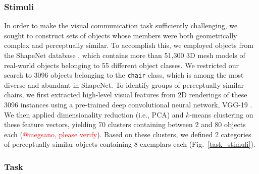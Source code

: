 \documentclass[10pt,letterpaper]{article}
\newcommand{\red}[1]{\textcolor{Red}{#1}}
\begin{document}
\subsubsection{Stimuli} 

In order to make the visual communication task sufficiently challenging, we sought to construct sets of objects whose members were both geometrically complex and perceptually similar. 
To accomplish this, we employed objects from the ShapeNet database \cite{chang2015shapenet}, which contains more than 51,300 3D mesh models of real-world objects belonging to 55 different object classes.
We restricted our search to 3096 objects belonging to the \texttt{chair} class, which is among the most diverse and abundant in ShapeNet. 
To identify groups of perceptually similar chairs, we first extracted high-level visual features from 2D renderings of these 3096 instances using a pre-trained deep convolutional neural network, VGG-19 \cite{simonyan2014very}.   
We then applied dimensionality reduction (i.e., PCA) and $k$-means clustering on these feature vectors, yielding 70 clusters containing between 2 and 80 objects each (\red{@megsano, please verify}).
Based on these clusters, we defined 2 categories of perceptually similar objects containing 8 exemplars each (Fig.~\ref{task_stimuli}). 

\subsubsection{Task} 
\end{document}
